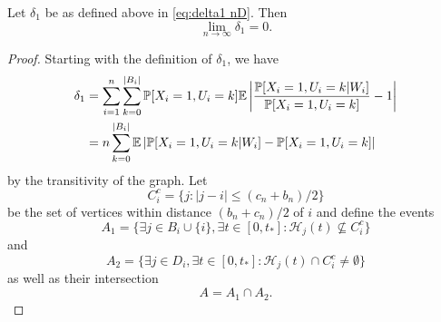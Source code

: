 		

	\begin{lemma}
	\label{lem:delta1 goes to 0 general}
		Let $\delta_1$ be as defined above in \eqref{eq:delta1 nD}. Then
		\begin{equation}
			\lim_{n\rightarrow\infty} \delta_1 = 0.
		\end{equation}
	\end{lemma}
	\begin{proof}
		Starting with the definition of $\delta_1$, we have
		\begin{align}
			\delta_1 &= \sum_{i = 1}^n \sum_{k = 0}^{|B_i|} \prob[X_i = 1, U_i = k] \expect \left| \frac{\prob[X_i = 1, U_i = k|W_i]}{\prob[X_i = 1, U_i = k]} - 1 \right|\\
			&= n \sum_{k = 0}^{|B_i|} \expect \left|\prob[X_i = 1, U_i = k|W_i] - \prob[X_i = 1, U_i = k] \right|%
			\label{eq:nD delta1 line 2}
		\end{align}
		by the transitivity of the graph.
		Let
		\begin{equation}
			C_i^c = \{j : |j - i| \leq (c_n + b_n)/2\}
		\end{equation}
		be the set of vertices within distance $(b_n + c_n)/2$ of $i$ and define the events
		\begin{equation}
			A_1 = \{\exists j \in B_i \cup \{i\}, \exists t \in [0, t_*] : \mathcal{H}_j(t) \nsubseteq  C_i^c\}
		\end{equation}
		and
		\begin{equation}
			A_2 = \{\exists j \in D_i, \exists t \in [0, t_*] : \mathcal{H}_j(t) \cap C_i^c \neq \emptyset\}
		\end{equation}
		as well as their intersection
		\begin{equation}
			A = A_1 \cap A_2.
		\end{equation}


\end{proof}
